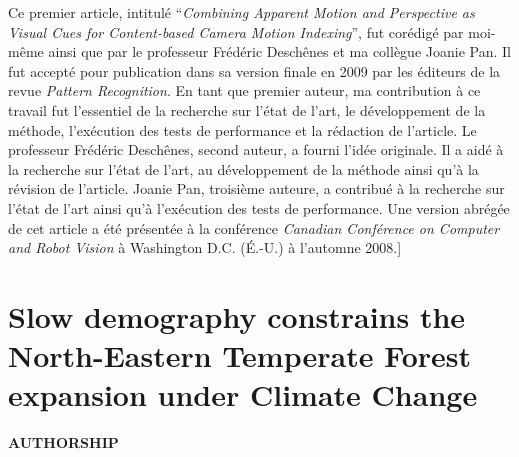 Ce premier article, intitulé \enquote{\textit{Combining Apparent Motion and Perspective as Visual Cues for Content-based Camera Motion Indexing}}, fut corédigé par moi-même ainsi que par le professeur Frédéric Deschênes et ma collègue Joanie Pan. Il fut accepté pour publication dans sa version finale en 2009 par les éditeurs de la revue \textit{Pattern Recognition}. En tant que premier auteur, ma contribution à ce travail fut l’essentiel de la recherche sur l’état de l’art, le développement de la méthode, l’exécution des tests de performance et la rédaction de l’article. Le professeur Frédéric Deschênes, second auteur, a fourni l’idée originale. Il a aidé à la recherche sur l’état de l’art, au développement de la méthode ainsi qu’à la révision de l’article. Joanie Pan, troisième auteure, a contribué à la recherche sur l’état de l’art ainsi qu’à l’exécution des tests de performance. Une version abrégée de cet article a été présentée à la conférence \textit{Canadian Conférence on Computer and Robot Vision} à Washington D.C. (É.-U.) à l’automne 2008.]

\newpage

\section{Slow demography constrains the North-Eastern Temperate Forest expansion under Climate Change}

\textbf{AUTHORSHIP}
